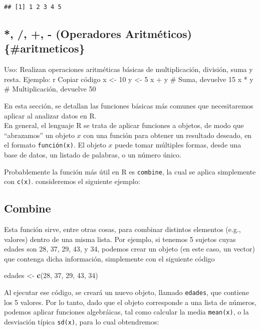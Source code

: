 \documentclass[
]{book}
\newenvironment{Shaded}{\begin{snugshade}}{\end{snugshade}}
\newcommand{\DecValTok}[1]{\textcolor[rgb]{0.00,0.00,0.81}{#1}}
\newcommand{\FunctionTok}[1]{\textcolor[rgb]{0.13,0.29,0.53}{\textbf{#1}}}
\newcommand{\NormalTok}[1]{#1}
\newcommand{\OtherTok}[1]{\textcolor[rgb]{0.56,0.35,0.01}{#1}}
\begin{document}
\begin{verbatim}
## [1] 1 2 3 4 5
\end{verbatim}

\hypertarget{operadores-aritmuxe9ticos-aritmeticos}{%
\subsection{*, /, +, - (Operadores Aritméticos) \{\#aritmeticos\}}\label{operadores-aritmuxe9ticos-aritmeticos}}

Uso: Realizan operaciones aritméticas básicas de multiplicación, división, suma y resta.
Ejemplo:
r
Copiar código
x \textless- 10
y \textless- 5
x + y \# Suma, devuelve 15
x * y \# Multiplicación, devuelve 50

En esta sección, se detallan las funciones básicas más comunes que necesitaremos aplicar al analizar datos en R.\\
En general, el lenguaje R se trata de aplicar funciones a objetos, de modo que ``abrazamos'' un objeto \(x\) con una función para obtener un resultado deseado, en el formato \texttt{función(x)}. El objeto \(x\) puede tomar múltiples formas, desde una base de datos, un listado de palabras, o un número único.

Probablemente la función más útil en R es \texttt{combine}, la cual se aplica simplemente con \texttt{c(x)}. consideremos el siguiente ejemplo:

\hypertarget{combine}{%
\subsection{Combine}\label{combine}}

Esta función sirve, entre otras cosas, para combinar distintos elementos (e.g., valores) dentro de una misma lista. Por ejemplo, si tenemos 5 sujetos cuyas edades son 28, 37, 29, 43, y 34, podemos crear un objeto (en este caso, un vector) que contenga dicha información, simplemente con el siguiente código

\begin{Shaded}
\begin{Highlighting}[]
\NormalTok{edades }\OtherTok{\textless{}{-}} \FunctionTok{c}\NormalTok{(}\DecValTok{28}\NormalTok{, }\DecValTok{37}\NormalTok{, }\DecValTok{29}\NormalTok{, }\DecValTok{43}\NormalTok{, }\DecValTok{34}\NormalTok{)}
\end{Highlighting}
\end{Shaded}

Al ejecutar ese código, se creará un nuevo objeto, llamado \texttt{edades}, que contiene los 5 valores. Por lo tanto, dado que el objeto corresponde a una lista de números, podemos aplicar funciones algebráicas, tal como calcular la media \texttt{mean(x)}, o la desviación típica \texttt{sd(x)}, para lo cual obtendremos:
\end{document}
